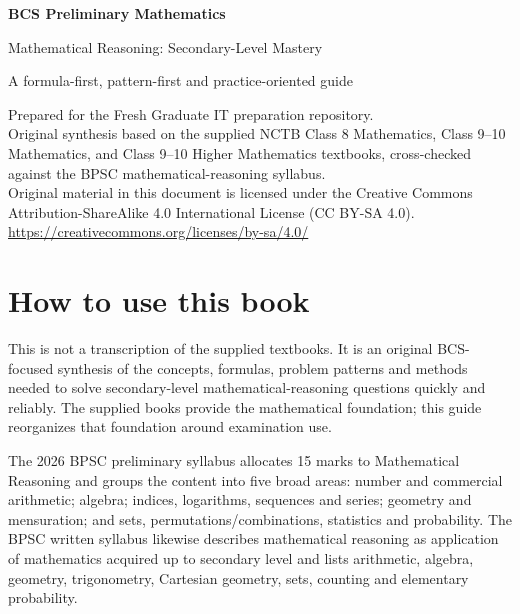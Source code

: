\documentclass[12pt,a4paper,oneside]{book}
\begin{document}
\frontmatter
\begin{titlepage}
  \centering
  {\LARGE\bfseries BCS Preliminary Mathematics\par}
  \vspace{0.4cm}
  {\Large Mathematical Reasoning: Secondary-Level Mastery\par}
  \vspace{0.8cm}
  {\large A formula-first, pattern-first and practice-oriented guide\par}
  \vfill
  {\small
  Prepared for the Fresh Graduate IT preparation repository.\\
  Original synthesis based on the supplied NCTB Class 8 Mathematics, Class 9--10 Mathematics,
  and Class 9--10 Higher Mathematics textbooks, cross-checked against the BPSC mathematical-reasoning syllabus.\\[0.3cm]
  Original material in this document is licensed under the Creative Commons Attribution-ShareAlike 4.0 International License (CC BY-SA 4.0).\\
  \url{https://creativecommons.org/licenses/by-sa/4.0/}\par}
\end{titlepage}

\chapter*{How to use this book}
This is not a transcription of the supplied textbooks. It is an original BCS-focused synthesis of the concepts, formulas, problem patterns and methods needed to solve secondary-level mathematical-reasoning questions quickly and reliably. The supplied books provide the mathematical foundation; this guide reorganizes that foundation around examination use.

The 2026 BPSC preliminary syllabus allocates 15 marks to Mathematical Reasoning and groups the content into five broad areas: number and commercial arithmetic; algebra; indices, logarithms, sequences and series; geometry and mensuration; and sets, permutations/combinations, statistics and probability. \cite{bpscpreli} The BPSC written syllabus likewise describes mathematical reasoning as application of mathematics acquired up to secondary level and lists arithmetic, algebra, geometry, trigonometry, Cartesian geometry, sets, counting and elementary probability. \cite{bpscwritten}
\end{document}
